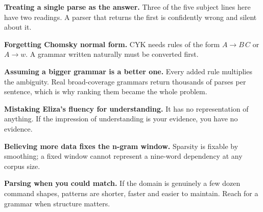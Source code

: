 \begin{pitfall}
\begin{tight}
  \item \textbf{Treating a single parse as the answer.} Three of the five subject
        lines here have two readings. A parser that returns the first is
        confidently wrong and silent about it.
  \item \textbf{Forgetting Chomsky normal form.} CYK needs rules of the form
        $A \to B\,C$ or $A \to w$. A grammar written naturally must be converted
        first.
  \item \textbf{Assuming a bigger grammar is a better one.} Every added rule
        multiplies the ambiguity. Real broad-coverage grammars return thousands of
        parses per sentence, which is why ranking them became the whole problem.
  \item \textbf{Mistaking Eliza's fluency for understanding.} It has no
        representation of anything. If the impression of understanding is your
        evidence, you have no evidence.
  \item \textbf{Believing more data fixes the n-gram window.} Sparsity is fixable
        by smoothing; a fixed window cannot represent a nine-word dependency at any
        corpus size.
  \item \textbf{Parsing when you could match.} If the domain is genuinely a few
        dozen command shapes, patterns are shorter, faster and easier to maintain.
        Reach for a grammar when structure matters.
\end{tight}
\end{pitfall}

